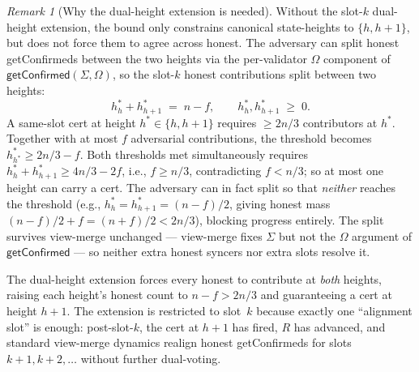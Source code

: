 \documentclass{article}
\newcommand{\getConfirmed}{\textsf{getConfirmed}\xspace}
\theoremstyle{plain}
\theoremstyle{definition}
\theoremstyle{remark}
\newtheorem{remark}[theorem]{Remark}
\begin{document}
\begin{remark}[Why the dual-height extension is needed]\label{rev:rem:dual-vote-needed}
Without the slot-$k$ dual-height extension, the  bound only constrains canonical state-heights to $\{h, h+1\}$, but does not force them to agree across honest. The adversary can split honest \getConfirmed{}s between the two heights via the per-validator $\Omega$ component of $\getConfirmed(\Sigma, \Omega)$, so the slot-$k$ honest contributions split between two heights:
\[
  h^*_h + h^*_{h+1} \;=\; n - f, \qquad h^*_h, h^*_{h+1} \;\geq\; 0.
\]
A same-slot cert at height $h^* \in \{h, h+1\}$ requires $\geq 2n/3$ contributors at $h^*$. Together with at most $f$ adversarial contributions, the threshold becomes $h^*_{h^*} \geq 2n/3 - f$. Both thresholds met simultaneously requires $h^*_h + h^*_{h+1} \geq 4n/3 - 2f$, i.e., $f \geq n/3$, contradicting $f < n/3$; so at most one height can carry a cert. The adversary can in fact split so that \emph{neither} reaches the threshold (e.g., $h^*_h = h^*_{h+1} = (n-f)/2$, giving honest mass $(n-f)/2 + f = (n+f)/2 < 2n/3$), blocking progress entirely. The split survives view-merge unchanged --- view-merge fixes $\Sigma$ but not the $\Omega$ argument of $\getConfirmed$ --- so neither extra honest syncers nor extra slots resolve it.

The dual-height extension forces every honest to contribute at \emph{both} heights, raising each height's honest count to $n - f > 2n/3$ and guaranteeing a cert at height $h+1$. The extension is restricted to slot~$k$ because exactly one ``alignment slot'' is enough: post-slot-$k$, the cert at $h+1$ has fired, $R$ has advanced, and standard view-merge dynamics realign honest \getConfirmed{}s for slots $k+1, k+2, \ldots$ without further dual-voting.
\end{remark}
\end{document}
